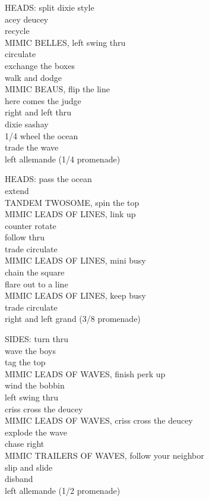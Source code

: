 \documentclass[12pt]{article}
\begin{document}
\bigskip
{}
HEADS: split dixie style \\
acey deucey \\
recycle \\
MIMIC BELLES, left swing thru \\
circulate \\
exchange the boxes \\
walk and dodge \\
MIMIC BEAUS, flip the line \\
here comes the judge \\
right and left thru \\
dixie sashay \\
1/4 wheel the ocean \\
trade the wave \\
left allemande  (1/4 promenade)
\endsequence

\bigskip


HEADS: pass the ocean\\
extend\\
TANDEM TWOSOME, spin the top\\
MIMIC LEADS OF LINES, link up\\
counter rotate \\
follow thru \\
trade circulate \\
MIMIC LEADS OF LINES, mini busy \\
chain the square \\
flare out to a line \\
MIMIC LEADS OF LINES, keep busy \\
trade circulate \\
right and left grand  (3/8 promenade)
\endsequence

SIDES: turn thru\\
wave the boys\\
tag the top\\
MIMIC LEADS OF WAVES, finish perk up\\
wind the bobbin\\
left swing thru \\
criss cross the deucey \\
MIMIC LEADS OF WAVES, criss cross the deucey\\
explode the wave \\
chase right \\
MIMIC TRAILERS OF WAVES, follow your neighbor \\
slip and slide \\
disband \\
left allemande  (1/2 promenade)
\endsequence
\end{document}
